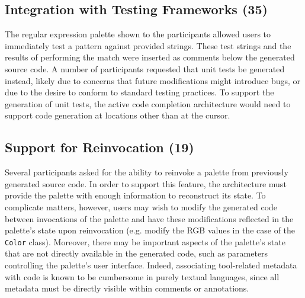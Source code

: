 \documentclass[10pt, conference, compsocconf]{IEEEtran}
\begin{document}
\subsection{Integration with Testing Frameworks (35)}
The regular expression palette shown to the participants allowed users to immediately test a pattern against provided strings. These test strings and the results of performing the match were inserted as comments below the generated source code. A number of participants requested that unit tests be generated instead, likely due to concerns that future modifications might introduce bugs, or due to the desire to conform to standard testing practices. To support the generation of unit tests, the active code completion architecture would need to support code generation at locations other than at the cursor.

%
 
\subsection{Support for Reinvocation (19)}
Several participants asked for the ability to reinvoke a palette from previously generated source code. In order to support this feature, the architecture must provide the palette with enough information to reconstruct its state. To complicate matters, however, users may wish to modify the generated code between invocations of the palette and have these modifications reflected in the palette's state upon reinvocation (e.g. modify the RGB values in the case of the \verb|Color| class). Moreover, there may be important aspects of the palette's state that are not directly available in the generated code, such as parameters controlling the palette's user interface. Indeed, associating tool-related metadata with code is known to be cumbersome in purely textual languages, since all metadata must be directly visible within comments or annotations. 
 
\end{document}
